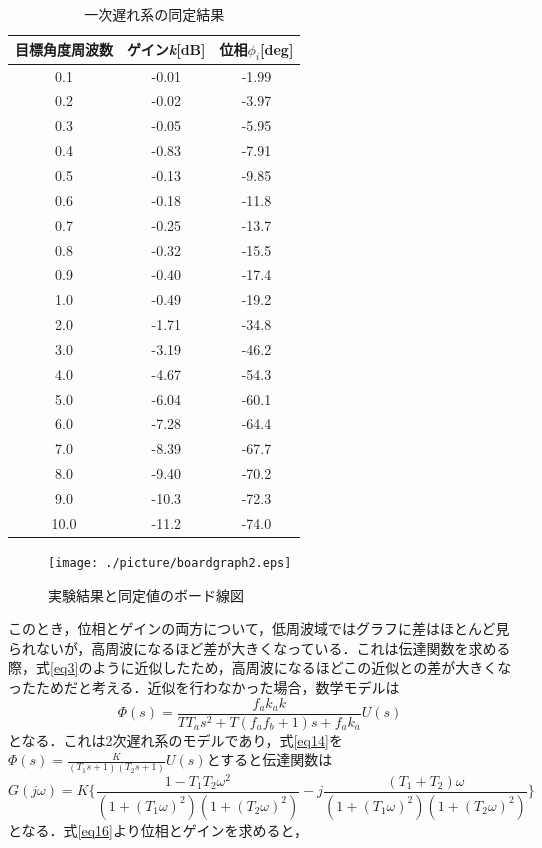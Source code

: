 \documentclass{jsarticle}
\begin{document}
\begin{table}[h]
 \begin{center}
  \caption{一次遅れ系の同定結果}
  \begin{tabular}{|c|c|c|} \hline
   目標角度周波数 & ゲイン{\it k}[dB] & 位相$\phi_i$[deg]\\ \hline \hline
   0.1 & -0.01 & -1.99 \\ \hline
   0.2 & -0.02 & -3.97 \\ \hline
   0.3 & -0.05 & -5.95 \\ \hline
   0.4 & -0.83 & -7.91 \\ \hline
   0.5 & -0.13 & -9.85 \\ \hline
   0.6 & -0.18 & -11.8 \\ \hline
   0.7 & -0.25 & -13.7 \\ \hline
   0.8 & -0.32 & -15.5 \\ \hline
   0.9 & -0.40 & -17.4 \\ \hline
   1.0 & -0.49 & -19.2 \\ \hline
   2.0 & -1.71 & -34.8 \\ \hline
   3.0 & -3.19 & -46.2 \\ \hline
   4.0 & -4.67 & -54.3 \\ \hline
   5.0 & -6.04 & -60.1 \\ \hline
   6.0 & -7.28 & -64.4 \\ \hline
   7.0 & -8.39 & -67.7 \\ \hline
   8.0 & -9.40 & -70.2 \\ \hline
   9.0 & -10.3 & -72.3 \\ \hline
   10.0 & -11.2 & -74.0 \\ \hline
  \end{tabular}
  \label{tab:table2}
 \end{center}
\end{table}

\begin{figure}[htbp]
 \begin{center}
  \texttt{[image: ./picture/boardgraph2.eps]}
  \caption{実験結果と同定値のボード線図}
  \label{fig:board2}
 \end{center}
\end{figure}

このとき，位相とゲインの両方について，低周波域ではグラフに差はほとんど見られないが，高周波になるほど差が大きくなっている．これは伝達関数を求める際，式\ref{eq3}のように近似したため，高周波になるほどこの近似との差が大きくなったためだと考える．近似を行わなかった場合，数学モデルは
\begin{equation}
\Phi(s) = \frac{f_a k_a k}{T T_a s^2 + T(f_a f_b + 1)s + f_a k_a} U(s)
 \label{eq14} 
\end{equation}
となる．これは2次遅れ系のモデルであり，式\ref{eq14}を$\Phi(s) = \frac{K}{(T_1 s + 1)(T_2 s + 1)} U(s)$とすると伝達関数は
\begin{equation}
G(j\omega) = K\{\frac{1 - T_1 T_2 \omega^2}{(1+(T_1 \omega)^2)(1 + (T_2 \omega)^2)} - j \frac{(T_1 + T_2)\omega}{(1+(T_1 \omega)^2)(1 + (T_2 \omega)^2)}\}
\label{eq16}
\end{equation}
となる．式\ref{eq16}より位相とゲインを求めると，
\end{document}
